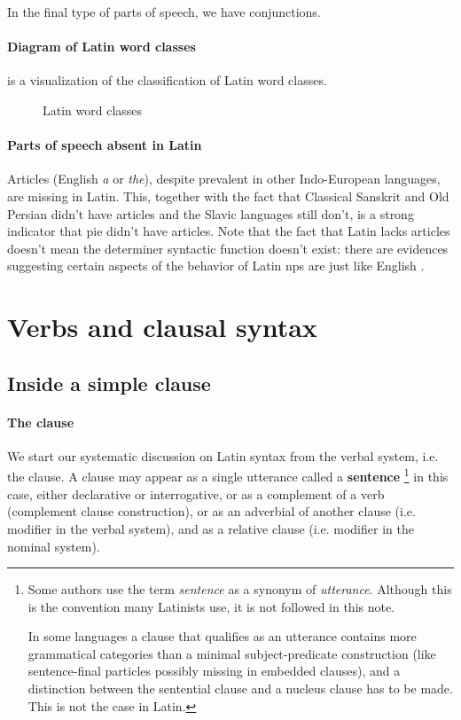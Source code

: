 \documentclass[a4paper, oneside, 12pt]{report}
\newcommand*{\concept}[1]{\textbf{#1}}
\newcommand*{\term}[1]{\emph{#1}}
\newcommand{\form}[1]{\emph{#1}}
\begin{document}
In the final type of parts of speech, 
we have conjunctions. 

\paragraph*{Diagram of Latin word classes} 
 is a visualization of the classification of Latin word classes.

\begin{sidewaysfigure}
    \centering
    \small
    
    \caption{Latin word classes}
    \label{fig:latin-word-class}
\end{sidewaysfigure}

\paragraph*{Parts of speech absent in Latin} 
Articles (English \form{a} or \form{the}), 
despite prevalent in other Indo-European languages,
are missing in Latin.
This, together with the fact that Classical Sanskrit and Old Persian didn't have articles 
and the Slavic languages still don't,
is a strong indicator that \ac{pie} didn't have articles. 
Note that the fact that Latin lacks articles 
doesn't mean the determiner syntactic function doesn't exist:
there are evidences suggesting certain aspects of the behavior of Latin \acs{np}s 
are just like English \citep{giusti2014split}.

\section{Verbs and clausal syntax}

\subsection{Inside a simple clause}

\paragraph*{The clause} We start our systematic discussion on Latin syntax from the verbal system, i.e. the clause. 
A clause may appear as a single utterance called a \concept{sentence}%
\footnote{
    Some authors use the term \term{sentence}
    as a synonym of \term{utterance}.
    Although this is the convention many Latinists use, 
    it is not followed in this note.

    In some languages a clause that qualifies as an utterance 
    contains more grammatical categories than 
    a minimal subject-predicate construction 
    (like sentence-final particles possibly missing in embedded clauses),
    and a distinction between the sentential clause and a nucleus clause 
    has to be made.
    This is not the case in Latin.
}
in this case,
either declarative or interrogative,
or as a complement of a verb (complement clause construction),
or as an adverbial of another clause
(i.e. modifier in the verbal system),
and as a relative clause 
(i.e. modifier in the nominal system).
\end{document}
